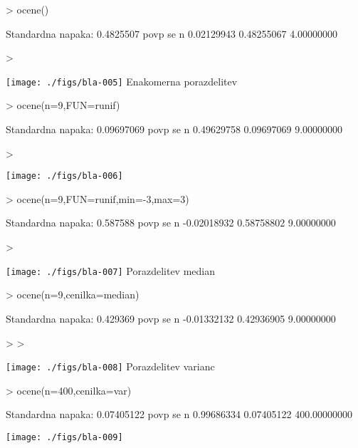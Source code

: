 \documentclass[a4paper,12pt]{article}
\begin{document}
\begin{Schunk}
\begin{Sinput}
> ocene()
\end{Sinput}
\begin{Soutput}
Standardna napaka: 
 0.4825507 
      povp         se          n 
0.02129943 0.48255067 4.00000000 
\end{Soutput}
\begin{Sinput}
> 
\end{Sinput}
\end{Schunk}
\texttt{[image: ./figs/bla-005]}
Enakomerna porazdelitev
\begin{Schunk}
\begin{Sinput}
> ocene(n=9,FUN=runif)
\end{Sinput}
\begin{Soutput}
Standardna napaka: 
 0.09697069 
      povp         se          n 
0.49629758 0.09697069 9.00000000 
\end{Soutput}
\begin{Sinput}
> 
\end{Sinput}
\end{Schunk}
\texttt{[image: ./figs/bla-006]}

\begin{Schunk}
\begin{Sinput}
> ocene(n=9,FUN=runif,min=-3,max=3)
\end{Sinput}
\begin{Soutput}
Standardna napaka: 
 0.587588 
       povp          se           n 
-0.02018932  0.58758802  9.00000000 
\end{Soutput}
\begin{Sinput}
> 
\end{Sinput}
\end{Schunk}
\texttt{[image: ./figs/bla-007]}
Porazdelitev median
\begin{Schunk}
\begin{Sinput}
> ocene(n=9,cenilka=median)
\end{Sinput}
\begin{Soutput}
Standardna napaka: 
 0.429369 
       povp          se           n 
-0.01332132  0.42936905  9.00000000 
\end{Soutput}
\begin{Sinput}
> 
> 
\end{Sinput}
\end{Schunk}
\texttt{[image: ./figs/bla-008]}
Porazdelitev varianc
\begin{Schunk}
\begin{Sinput}
> ocene(n=400,cenilka=var)
\end{Sinput}
\begin{Soutput}
Standardna napaka: 
 0.07405122 
        povp           se            n 
  0.99686334   0.07405122 400.00000000 
\end{Soutput}
\end{Schunk}
\texttt{[image: ./figs/bla-009]}
\end{document}
